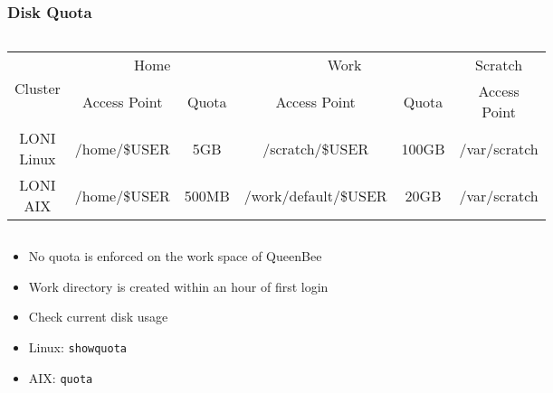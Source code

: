 \documentclass[slidestop,mathserif,compress,xcolor=svgnames,table]{beamer}
\begin{document}
\begin{frame}
  \frametitle{\small Disk Quota}
  {\scriptsize
  \begin{columns}
    \column{12cm}
    \begin{block}{}
      \begin{center}
	\begin{tabular}{|c|c|c|c|c|c|}
	  \hline
	  \multirow{2}{*}{Cluster} & \multicolumn{2}{c|}{Home} & \multicolumn{2}{c|}{Work} & Scratch \\
	  \cline{2-6}
	  & Access Point & Quota & Access Point & Quota & Access Point \\
	  \hline
	  LONI Linux & /home/\$USER & 5GB & /scratch/\$USER & 100GB & /var/scratch\\
	  \hline
	  LONI AIX & /home/\$USER & 500MB & /work/default/\$USER & 20GB & /var/scratch\\
	  \hline
	\end{tabular}
      \end{center}
    \end{block}
  \end{columns}
  }
  {\footnotesize
  \begin{itemize}
    \item No quota is enforced on the work space of QueenBee
    \item Work directory is created within an hour of first login
    \item Check current disk usage
    \item[] Linux: \texttt{showquota}
    \item[] AIX: \texttt{quota}
   \end{itemize}
  }
\end{frame}
\end{document}
